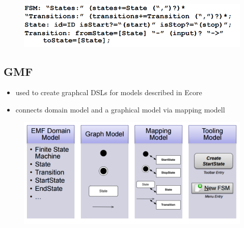 \documentclass[runningheads,a4paper]{llncs}
\begin{document}
    \begin{figure}[H]
      \centering
      \includegraphics[width=\textwidth]{images/XTextGrammar.PNG}
    \end{figure}
   
%     
    \subsection{GMF}
     \begin{itemize}
     \item used to create graphcal DSLs for  models described in Ecore
     \item connects domain model and a graphical model via mapping modell
    \end{itemize}
    
    \begin{figure}[ht]
      \centering
      \includegraphics[width=\textwidth]{images/TableGMFSteps.PNG}
    \end{figure}
\end{document}
